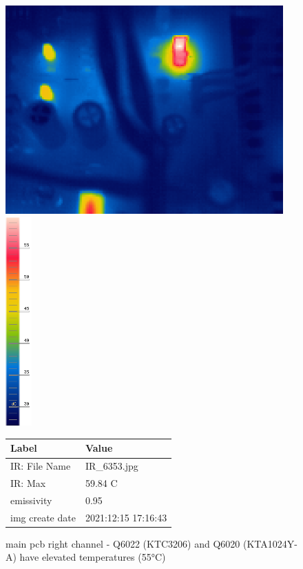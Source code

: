 \documentclass[a4paper,twoside,notitlepage]{article}
\begin{document}

\begin{figure}[hptb!]
 \centering
 \includegraphics[height=8cm, keepaspectratio=true]{img_report/IR_6353}
 \includegraphics[height=8cm, keepaspectratio=true]{img_report/IR_6353_scale}
 \label{fig:left-ch-ir}

 \vspace*{5mm}
 \begin{tabular}{ l | l }
  Label & Value \\ \hline
  IR: File Name & IR\_6353.jpg \\
  IR: Max & 59.84 C \\
  emissivity & 0.95 \\
  img create date & 2021:12:15 17:16:43 \\
 \end{tabular}
 \caption{main pcb right channel - Q6022 (KTC3206) and Q6020 (KTA1024Y-A) have elevated temperatures (55\si{\celsius})}
\end{figure}
\end{document}
